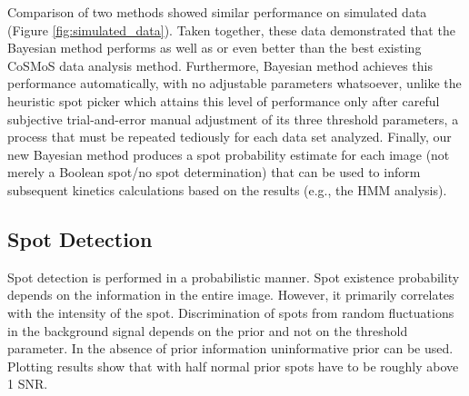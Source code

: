 Comparison of two methods showed similar performance on simulated data (Figure \ref{fig:simulated_data}). Taken together, these data demonstrated that the Bayesian method performs as well as or even better than the best existing CoSMoS data analysis method. Furthermore, Bayesian method achieves this performance automatically, with no adjustable parameters whatsoever, unlike the heuristic spot picker which attains this level of performance only after careful subjective trial-and-error manual adjustment of its three threshold parameters, a process that must be repeated tediously for each data set analyzed. Finally, our new Bayesian method produces a spot probability estimate for each image (not merely a Boolean spot/no spot determination) that can be used to inform subsequent kinetics calculations based on the results (e.g., the HMM analysis).


\subsection{Spot Detection}

Spot detection is performed in a probabilistic manner. Spot existence probability depends on the information in the entire image. However, it primarily correlates with the intensity of the spot. Discrimination of spots from random fluctuations in the background signal depends on the prior and not on the threshold parameter. In the absence of prior information uninformative prior can be used. Plotting results show that with half normal prior spots have to be roughly above 1 SNR.

